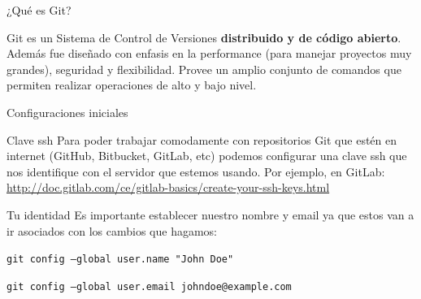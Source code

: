 \documentclass{beamer}
\begin{document}
\begin{frame}{¿Qué es Git?}

	\begin{block}{}
		Git es un Sistema de Control de Versiones \textbf{distribuido y de código abierto}. Además fue diseñado con enfasis en la performance (para manejar proyectos muy grandes), seguridad y flexibilidad.  Provee un amplio conjunto de comandos que permiten realizar operaciones de alto y bajo nivel.
	\end{block}
\end{frame}

\begin{frame}[fragile]{Configuraciones iniciales}

	\begin{block}{Clave ssh}
		Para poder trabajar comodamente con repositorios Git que estén en internet (GitHub, Bitbucket, GitLab, etc) podemos configurar una clave ssh que nos identifique con el servidor que estemos usando.
		Por ejemplo, en GitLab: \url{http://doc.gitlab.com/ce/gitlab-basics/create-your-ssh-keys.html}	
	\end{block}

    \begin{block}{Tu identidad}
        Es importante establecer nuestro nombre y email ya que estos van a ir asociados con los cambios que hagamos:

        \vspace{0.5em}

        \texttt{git config --global user.name "John Doe"}

        \texttt{git config --global user.email johndoe@example.com}
    \end{block}


\end{frame}
\end{document}
